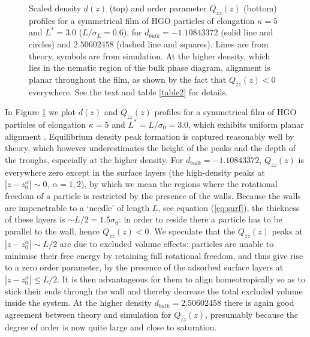 \documentclass[aps,pre,twocolumn,groupedaddress,showpacs]{revtex4}
\newlength{\picW}	%
\newcommand{\picB}[1]{\fbox{\texttt{[image: \#1]}}}
\begin{document}
\picW=8cm
\begin{figure}
	\picB{bigbridfig1.eps}
	\caption{Scaled density $d(z)$ (top) and order parameter $Q_{zz}(z)$ (bottom)
	profiles for a symmetrical film of HGO particles of elongation $\kappa=5$ and 
	$L^*=3.0$ ($L/\sigma_L=0.6$), for $d_{bulk}=-1.10843372$ (solid line and 
	circles) and $2.50602458$ (dashed line and squares). Lines are from theory, 
	symbols are from simulation. At the higher density, which lies in the nematic 
	region of the bulk phase diagram, alignment is planar throughout the film, 
	as shown by the fact that $Q_{zz}(z)<0$ everywhere. See the text and table 
	\protect\ref{table2} for details.}
\label{fig1}
\end{figure}


In Figure \ref{fig1} we plot $d(z)$ and $Q_{zz}(z)$ profiles for a symmetrical 
film of HGO particles of elongation $\kappa=5$ and $L^*=L/\sigma_0=3.0$, 
which exhibits uniform planar alignment \cite{Cleaver:2001,Barmes:2003}. 
Equilibrium density peak formation is captured reasonably well by theory, 
which however underestimates the height of the peaks and the depth of the 
troughs, especially at the higher density. For $d_{bulk}=-1.10843372$, 
$Q_{zz}(z)$ is everywhere zero except in the surface layers (the high-density
peaks at $|z-z_0^{\alpha}|\sim 0$, $\alpha=1,2$), by which we mean 
the regions where the rotational freedom of a particle is restricted by the 
presence of the walls. Because the walls are impenetrable to a `needle' of 
length $L$, see equation (\ref{eq:surf}), the thickness of these layers is 
$\sim L/2= 1.5\sigma_0$: in order to reside there a particle has to be 
parallel to the wall, hence $Q_{zz}(z)<0$.
We speculate that the $Q_{zz}(z)$ peaks at $|z-z_0^{\alpha}|\sim L/2$
are due to excluded volume effects: particles are unable to minimise their 
free energy by retaining full rotational freedom, and thus give rise to 
a zero order parameter, by the presence of the adsorbed surface layers at 
$|z-z_0^{\alpha}|\le L/2$. It is then advantageous for them to align 
homeotropically so as to stick their ends through the wall and thereby
decrease the total excluded volume inside the system.
At the higher density $d_{bulk}=2.50602458$ there is again good agreement 
between theory and simulation for $Q_{zz}(z)$, presumably because the degree 
of order is now quite large and close to saturation.\\
\end{document}
